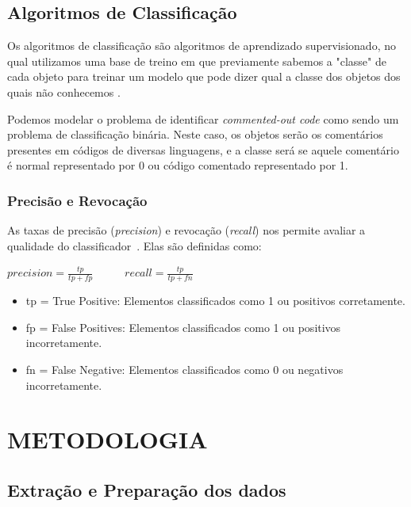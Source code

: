 \documentclass{abnt}
\begin{document}
\section{Algoritmos de Classificação}
Os algoritmos de classificação são algoritmos de aprendizado supervisionado,
no qual utilizamos uma base de treino em que previamente sabemos a "classe" 
de cada objeto para treinar um modelo que pode dizer qual a classe dos 
objetos dos quais não conhecemos \cite{patternClassification}.

Podemos modelar o problema de identificar \textit{commented-out code} como sendo um problema
de classificação binária. Neste caso, os objetos serão os comentários presentes em 
códigos de diversas linguagens, e a classe será se aquele comentário é normal 
representado por 0 ou código comentado representado por 1.

\subsection{Precisão e Revocação}
As taxas de precisão (\textit{precision}) e revocação (\textit{recall}) nos permite avaliar a qualidade do classificador~\cite{powers2011evaluation}.
Elas são definidas como:
\begin{center}
  

\begin{math}
  precision = \frac{tp}{tp +fp}
\end{math}~~~~~
\begin{math}
  recall = \frac{tp}{tp +fn}
\end{math}
\end{center}

\begin{itemize}
  \item tp = True Positive: Elementos classificados como 1 ou positivos corretamente.
  \item fp = False Positives: Elementos classificados como 1 ou positivos incorretamente.
  \item fn = False Negative: Elementos classificados como 0 ou negativos incorretamente.
\end{itemize}


\chapter{METODOLOGIA}

\section{Extração e Preparação dos dados}
\end{document}

